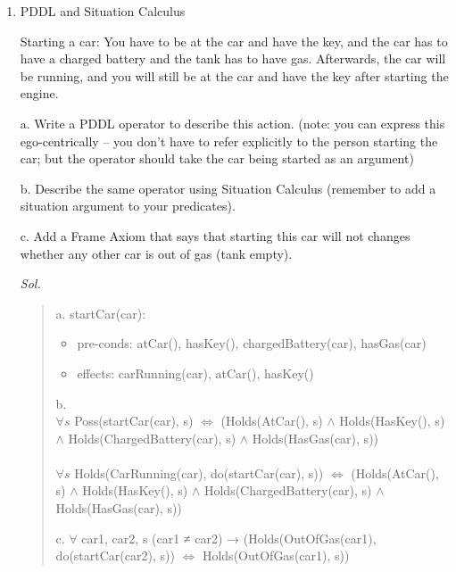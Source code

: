 \documentclass{article}
\theoremstyle{definition}
\newcommand{\<}{\langle}
\renewcommand{\>}{\rangle}
\renewcommand{\iff}{\Leftrightarrow}
\begin{document}
\begin{enumerate}[label=\textbf{\Alph*}]
\newpage

\item PDDL and Situation Calculus

  \vspace{1.5em}
  
    Starting a car: You have to be at the car and have the key, and the car has to have a charged battery and the tank has to have gas. Afterwards, the car will be running, and you will still be at the car and have the key after starting the engine. 

    a. Write a PDDL operator to describe this action.
(note: you can express this ego-centrically – you don’t have to refer explicitly to the
person starting the car; but the operator should take the car being started as an argument)

    b. Describe the same operator using Situation Calculus (remember to add a situation
argument to your predicates).

    c. Add a Frame Axiom that says that starting this car will not changes whether any other
car is out of gas (tank empty).
    \vspace{1em} 
    
    \textit{ Sol. }
    \begin{quote}
        a. startCar(car):
        \begin{itemize}
            \item  pre-conds: atCar(), hasKey(), chargedBattery(car), hasGas(car)
            \item effects: carRunning(car), atCar(), hasKey()
        \end{itemize}
        b. \\
        $\forall s$ Poss(startCar(car), s) $\iff$ (Holds(AtCar(), s) $\land$ Holds(HasKey(), s) $\land$ Holds(ChargedBattery(car), s) $\land$ Holds(HasGas(car), s)) \\ \\
        $\forall s$ Holds(CarRunning(car), do(startCar(car), s)) $\iff$ (Holds(AtCar(), s) $\land$ Holds(HasKey(), s) $\land$ Holds(ChargedBattery(car), s) $\land$ Holds(HasGas(car), s))
    
        c. $\forall$ car1, car2, s (car1 ≠ car2) → (Holds(OutOfGas(car1), do(startCar(car2), s)) $\iff$ Holds(OutOfGas(car1), s))
    \end{quote}
    
\end{enumerate}
\end{document}
